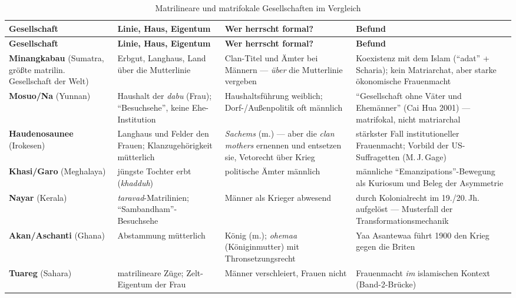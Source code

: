 \documentclass[11pt,a4paper,ngerman]{scrartcl}
\begin{document}
\begin{small}
\begin{longtable}{>{\raggedright\arraybackslash}p{}>{\raggedright\arraybackslash}p{}>{\raggedright\arraybackslash}p{}>{\raggedright\arraybackslash}p{}}
\caption{Matrilineare und matrifokale Gesellschaften im Vergleich}\\
\toprule
\textbf{Gesellschaft} & \textbf{Linie, Haus, Eigentum} & \textbf{Wer herrscht formal?} & \textbf{Befund}\\
\midrule
\endfirsthead
\toprule
\textbf{Gesellschaft} & \textbf{Linie, Haus, Eigentum} & \textbf{Wer herrscht formal?} & \textbf{Befund}\\
\midrule
\endhead
\textbf{Minangkabau} (Sumatra, größte matrilin. Gesellschaft der Welt) & Erbgut, Langhaus, Land über die Mutterlinie & Clan-Titel und Ämter bei Männern --- \emph{über} die Mutterlinie vergeben & Koexistenz mit dem Islam (\enquote{adat} + Scharia); kein Matriarchat, aber starke ökonomische Frauenmacht \\
\addlinespace[2pt]
\textbf{Mosuo/Na} (Yunnan) & Haushalt der \emph{dabu} (Frau); \enquote{Besuchsehe}, keine Ehe-Institution & Haushaltsführung weiblich; Dorf-/Außenpolitik oft männlich & \enquote{Gesellschaft ohne Väter und Ehemänner} (Cai Hua 2001) --- matrifokal, nicht matriarchal \\
\addlinespace[2pt]
\textbf{Haudenosaunee} (Irokesen) & Langhaus und Felder den Frauen; Klanzugehörigkeit mütterlich & \emph{Sachems} (m.) --- aber die \emph{clan mothers} ernennen und entsetzen sie, Vetorecht über Krieg & stärkster Fall institutioneller Frauenmacht; Vorbild der US-Suffragetten (M.\,J.\,Gage) \\
\addlinespace[2pt]
\textbf{Khasi/Garo} (Meghalaya) & jüngste Tochter erbt (\emph{khadduh}) & politische Ämter männlich & männliche \enquote{Emanzipations}-Bewegung als Kuriosum und Beleg der Asymmetrie \\
\addlinespace[2pt]
\textbf{Nayar} (Kerala) & \emph{taravad}-Matrilinien; \enquote{Sambandham}-Besuchsehe & Männer als Krieger abwesend & durch Kolonialrecht im 19./20.\,Jh. aufgelöst --- Musterfall der Transformationsmechanik \\
\addlinespace[2pt]
\textbf{Akan/Aschanti} (Ghana) & Abstammung mütterlich & König (m.); \emph{ohemaa} (Königinmutter) mit Thronsetzungsrecht & Yaa Asantewaa führt 1900 den Krieg gegen die Briten \\
\addlinespace[2pt]
\textbf{Tuareg} (Sahara) & matrilineare Züge; Zelt-Eigentum der Frau & Männer verschleiert, Frauen nicht & Frauenmacht \emph{im} islamischen Kontext (Band-2-Brücke) \\
\bottomrule
\end{longtable}
\end{small}
\end{document}
